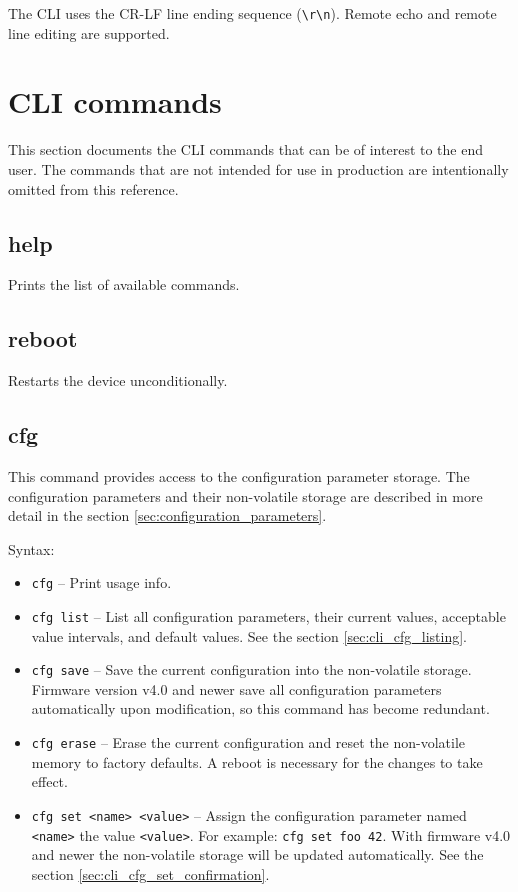 \documentclass{zubaxdoc}
\begin{document}
The CLI uses the CR-LF line ending sequence (\verb|\r\n|).
Remote echo and remote line editing are supported.

\section{CLI commands}

This section documents the CLI commands that can be of interest to the end user.
The commands that are not intended for use in production are intentionally omitted from this reference.

\subsection{help}

Prints the list of available commands.

\subsection{reboot}

Restarts the device unconditionally.

\subsection{cfg}

This command provides access to the configuration parameter storage.
The configuration parameters and their non-volatile storage are described in more detail in the section
\ref{sec:configuration_parameters}.

Syntax:
\begin{itemize}

    \item \verb|cfg| -- Print usage info.

    \item \verb|cfg list| -- List all configuration parameters, their current values,
          acceptable value intervals, and default values. See the section \ref{sec:cli_cfg_listing}.

    \item \verb|cfg save| -- Save the current configuration into the non-volatile storage.
          Firmware version v4.0 and newer save all configuration parameters automatically upon modification,
          so this command has become redundant.

    \item \verb|cfg erase| -- Erase the current configuration and reset the non-volatile memory to factory defaults.
          A reboot is necessary for the changes to take effect.

    \item \verb|cfg set <name> <value>| -- Assign the configuration parameter named \verb|<name>| the value
          \verb|<value>|. For example: \verb|cfg set foo 42|.
          With firmware v4.0 and newer the non-volatile storage will be updated automatically.
          See the section \ref{sec:cli_cfg_set_confirmation}.

\end{itemize}
\end{document}
